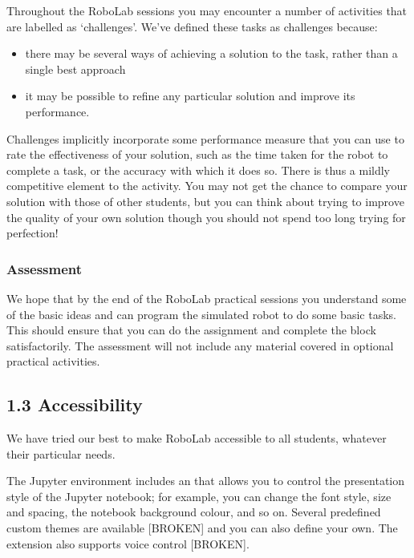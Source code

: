 \documentclass[letterpaper,10pt,english]{sphinxmanual}
\begin{document}
Throughout the RoboLab sessions you may encounter a number of activities that are labelled as ‘challenges’. We’ve defined these tasks as challenges because:
\begin{itemize}
\item {} 
there may be several ways of achieving a solution to the task, rather than a single best approach

\item {} 
it may be possible to refine any particular solution and improve its performance.

\end{itemize}

Challenges implicitly incorporate some performance measure that you can use to rate the effectiveness of your solution, such as the time taken for the robot to complete a task, or the accuracy with which it does so. There is thus a mildly competitive element to the activity. You may not get the chance to compare your solution with those of other students, but you can think about trying to improve the quality of your own solution \textendash{} though you should not spend too long trying for perfection!


\subsubsection{Assessment}
\label{\detokenize{content/00_READ_ME_FIRST/Section_00_02_Workload:Assessment}}
We hope that by the end of the RoboLab practical sessions you understand some of the basic ideas and can program the simulated robot to do some basic tasks. This should ensure that you can do the assignment and complete the block satisfactorily. The assessment will not include any material covered in optional practical activities.


\subsection{1.3 Accessibility}
\label{\detokenize{content/00_READ_ME_FIRST/Section_00_03_Accessibility:1.3-Accessibility}}\label{\detokenize{content/00_READ_ME_FIRST/Section_00_03_Accessibility::doc}}
We have tried our best to make RoboLab accessible to all students, whatever their particular needs.


The Jupyter environment includes an  that allows you to control the presentation style of the Jupyter notebook; for example, you can change the font style, size and spacing, the notebook background colour, and so on. Several predefined custom themes are available {[}BROKEN{]} and you can also define your own. The extension also supports voice control {[}BROKEN{]}.
\end{document}

